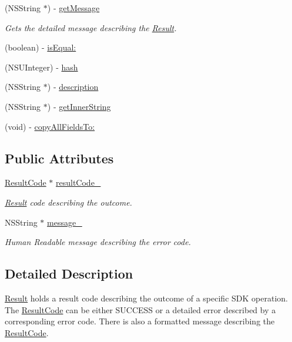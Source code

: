 \begin{DoxyCompactItemize}
(N\+S\+String $\ast$) -\/ \hyperlink{interface_result_abe56628a08c33b12b2b62d18bd3a0f4f}{get\+Message}
\begin{DoxyCompactList}\small\item\em Gets the detailed message describing the \hyperlink{interface_result}{Result}. \end{DoxyCompactList}\item 
(boolean) -\/ \hyperlink{interface_result_a90b2fad03726c3afea795cdc3a18d093}{is\+Equal\+:}
\item 
(N\+S\+U\+Integer) -\/ \hyperlink{interface_result_a00d104d3acc5597e11c0e6b30da6f979}{hash}
\item 
(N\+S\+String $\ast$) -\/ \hyperlink{interface_result_a2609d3fcdb2e8c25235ce359f5cb695f}{description}
\item 
(N\+S\+String $\ast$) -\/ \hyperlink{interface_result_aceda0a8cb84e1c97c5c535fa8d971c41}{get\+Inner\+String}
\item 
(void) -\/ \hyperlink{interface_result_aafa1fc02d0de05e8cbc4177afff47569}{copy\+All\+Fields\+To\+:}
\end{DoxyCompactItemize}
\subsection*{Public Attributes}
\begin{DoxyCompactItemize}
\item 
\hyperlink{interface_result_code}{Result\+Code} $\ast$ \hyperlink{interface_result_ac9012dcb96277da30fa131abdcecd808}{result\+Code\+\_\+}
\begin{DoxyCompactList}\small\item\em \hyperlink{interface_result}{Result} code describing the outcome. \end{DoxyCompactList}\item 
N\+S\+String $\ast$ \hyperlink{interface_result_abc70a4b2ffccc33515721959d714e46d}{message\+\_\+}
\begin{DoxyCompactList}\small\item\em Human Readable message describing the error code. \end{DoxyCompactList}\end{DoxyCompactItemize}


\subsection{Detailed Description}
\hyperlink{interface_result}{Result} holds a result code describing the outcome of a specific S\+D\+K operation. The \hyperlink{interface_result_code}{Result\+Code} can be either S\+U\+C\+C\+E\+S\+S or a detailed error described by a corresponding error code. There is also a formatted message describing the \hyperlink{interface_result_code}{Result\+Code}. 

